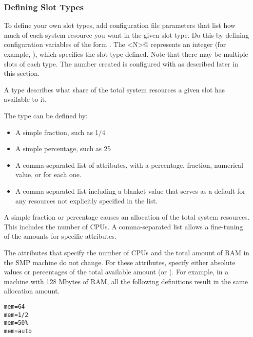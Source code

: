 \subsubsection{\label{sec:Slot-Type-Define}
Defining Slot Types}

To define your own slot types, add configuration file
parameters that list how much of each system resource you want in the
given slot type.  Do this by defining configuration
variables of the form
.
The \verb@<N>@ represents an integer (for example, 
), which specifies the slot type defined.
Note that there may be multiple slots of each type.  The number created
is configured with  as described later in
this section.

A type describes what share of the total system resources a given
slot has available to it.

The type can be defined by:
\begin{itemize}
  \item A simple fraction, such as 1/4
  \item A simple percentage, such as 25\Percent
  \item A comma-separated list of attributes, with a percentage,
	fraction, numerical value, or  for each one.
  \item A comma-separated list including a blanket value that serves
        as a default for any resources not explicitly specified in the list.
\end{itemize}
A simple fraction or percentage causes an allocation
of the total system resources.
This includes the number of CPUs.
A comma-separated list allows a fine-tuning of
the amounts for specific attributes.

The attributes that specify the number of CPUs
and the total amount of RAM in
the SMP machine do not change.
For these attributes, specify either absolute values or
percentages of the total available amount (or ).  
For example, in a machine with 128 Mbytes of RAM,
all the following definitions result in the same allocation amount.
\begin{verbatim}
mem=64
mem=1/2
mem=50%
mem=auto
\end{verbatim}

